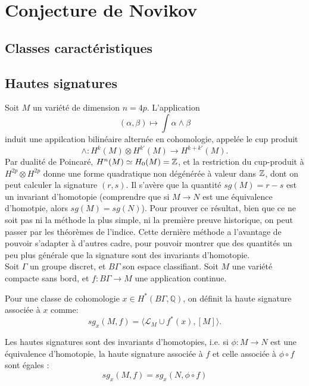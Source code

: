\section{Conjecture de Novikov}

\subsection{Classes caractéristiques}
\subsection{Hautes signatures}
Soit $M$ un variété de dimension $n=4p$. L'application
\[(\alpha,\beta)\mapsto \int \alpha\wedge \beta\]
induit une appilcation bilinéaire alternée en cohomologie, appelée le cup produit
\[\wedge : H^k(M)\otimes H^{k'}(M) \rightarrow H^{k+k'}(M).\]
Par dualité de Poincaré, $H^n(M)\simeq H_0(M)=\mathbb Z$, et la restriction du cup-produit à $H^{2p}\otimes H^{2p}$ donne une forme quadratique non dégénérée à valeur dans $\mathbb Z$, dont on peut calculer la signature $(r,s)$. Il s'avère que la quantité $sg(M)=r-s$ est un invariant d'homotopie (comprendre que si $M\rightarrow N$ est une équivalence d'homotpie, alors $sg(M)=sg(N)$).  Pour prouver ce résultat, bien que ce ne soit pas ni la méthode la plus simple, ni la première preuve historique, on peut passer par les théorèmes de l'indice. Cette dernière méthode a l'avantage de pouvoir s'adapter à d'autres cadre, pour pouvoir montrer que des quantités un peu plus générale que la signature sont des invariants d'homotopie. \\

Soit $\Gamma$ un groupe discret, et $B\Gamma$ son espace classifiant. Soit $M$ une variété compacte sans bord, et $f : B\Gamma \rightarrow M$ une application continue.
\begin{definition}
Pour une classe de cohomologie $x\in H^*(B\Gamma,\mathbb Q)$, on définit la haute signature associée à $x$ comme:
\[sg_x(M,f) = \langle \mathcal L_M \cup f^*(x), [M]\rangle.\] 
\end{definition}

\begin{conj}[Novikov]
Les hautes signatures sont des invariants d'homotopies, i.e. si $\phi : M\rightarrow N$ est une équivalence d'homotopie, la haute signature associée à $f$ et celle associée à $\phi\circ f$ sont égales :
\[sg_x(M,f)=sg_x(N,\phi\circ f)\]
\end{conj}